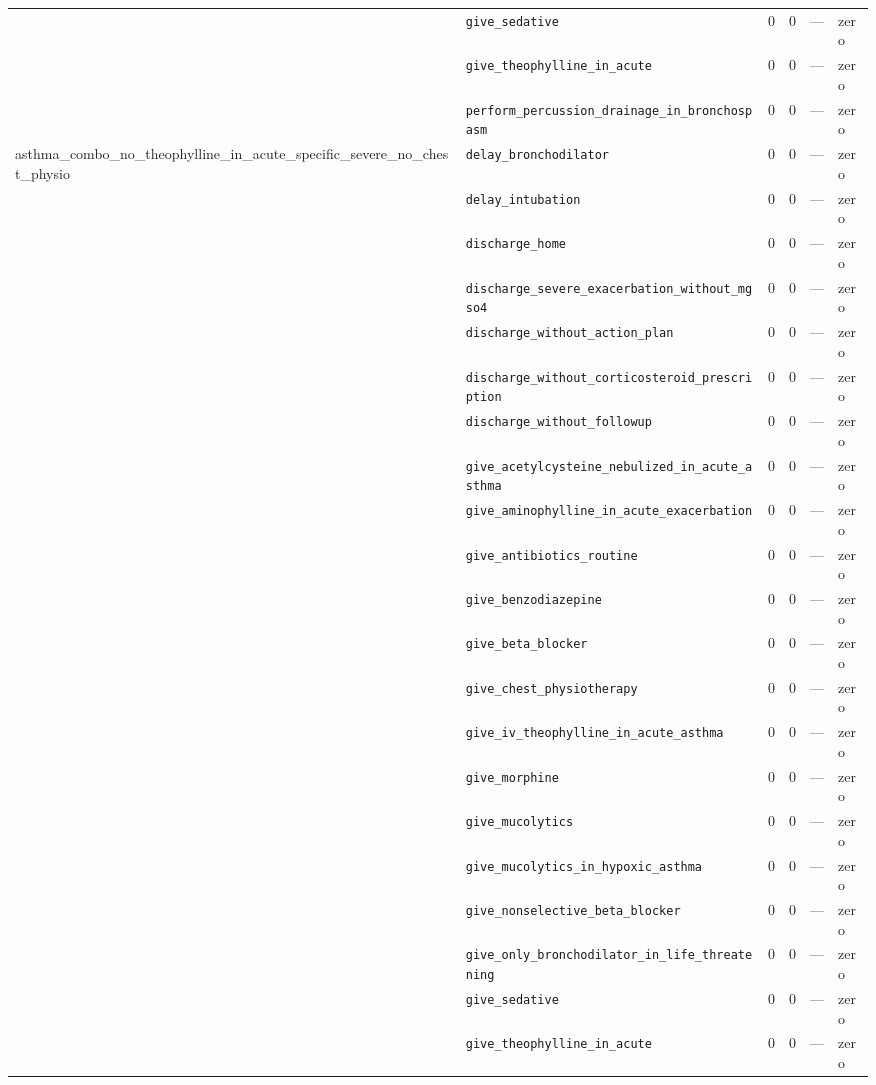\begin{table}[ht]
\begin{tabular}{llrrrl}
 & \texttt{give\_sedative} & 0 & 0 & — & zero \\
 & \texttt{give\_theophylline\_in\_acute} & 0 & 0 & — & zero \\
 & \texttt{perform\_percussion\_drainage\_in\_bronchospasm} & 0 & 0 & — & zero \\
\midrule
asthma\_combo\_no\_theophylline\_in\_acute\_specific\_severe\_no\_chest\_physio & \texttt{delay\_bronchodilator} & 0 & 0 & — & zero \\
 & \texttt{delay\_intubation} & 0 & 0 & — & zero \\
 & \texttt{discharge\_home} & 0 & 0 & — & zero \\
 & \texttt{discharge\_severe\_exacerbation\_without\_mgso4} & 0 & 0 & — & zero \\
 & \texttt{discharge\_without\_action\_plan} & 0 & 0 & — & zero \\
 & \texttt{discharge\_without\_corticosteroid\_prescription} & 0 & 0 & — & zero \\
 & \texttt{discharge\_without\_followup} & 0 & 0 & — & zero \\
 & \texttt{give\_acetylcysteine\_nebulized\_in\_acute\_asthma} & 0 & 0 & — & zero \\
 & \texttt{give\_aminophylline\_in\_acute\_exacerbation} & 0 & 0 & — & zero \\
 & \texttt{give\_antibiotics\_routine} & 0 & 0 & — & zero \\
 & \texttt{give\_benzodiazepine} & 0 & 0 & — & zero \\
 & \texttt{give\_beta\_blocker} & 0 & 0 & — & zero \\
 & \texttt{give\_chest\_physiotherapy} & 0 & 0 & — & zero \\
 & \texttt{give\_iv\_theophylline\_in\_acute\_asthma} & 0 & 0 & — & zero \\
 & \texttt{give\_morphine} & 0 & 0 & — & zero \\
 & \texttt{give\_mucolytics} & 0 & 0 & — & zero \\
 & \texttt{give\_mucolytics\_in\_hypoxic\_asthma} & 0 & 0 & — & zero \\
 & \texttt{give\_nonselective\_beta\_blocker} & 0 & 0 & — & zero \\
 & \texttt{give\_only\_bronchodilator\_in\_life\_threatening} & 0 & 0 & — & zero \\
 & \texttt{give\_sedative} & 0 & 0 & — & zero \\
 & \texttt{give\_theophylline\_in\_acute} & 0 & 0 & — & zero \\

\end{tabular}
\end{table}
